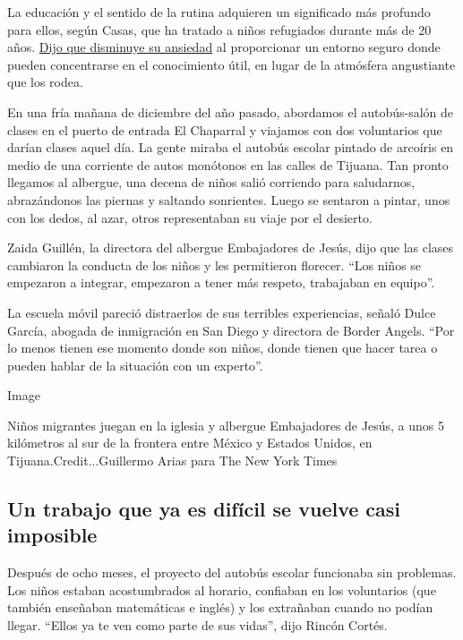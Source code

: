 La educación y el sentido de la rutina adquieren un significado más
profundo para ellos, según Casas, que ha tratado a niños refugiados
durante más de 20 años.
\href{https://onlinelibrary.wiley.com/doi/10.1002/9780470669280.ch12}{Dijo
que disminuye su ansiedad} al proporcionar un entorno seguro donde
pueden concentrarse en el conocimiento útil, en lugar de la atmósfera
angustiante que los rodea.

En una fría mañana de diciembre del año pasado, abordamos el
autobús-salón de clases en el puerto de entrada El Chaparral y viajamos
con dos voluntarios que darían clases aquel día. La gente miraba el
autobús escolar pintado de arcoíris en medio de una corriente de autos
monótonos en las calles de Tijuana. Tan pronto llegamos al albergue, una
decena de niños salió corriendo para saludarnos, abrazándonos las
piernas y saltando sonrientes. Luego se sentaron a pintar, unos con los
dedos, al azar, otros representaban su viaje por el desierto.

Zaida Guillén, la directora del albergue Embajadores de Jesús, dijo que
las clases cambiaron la conducta de los niños y les permitieron
florecer. ``Los niños se empezaron a integrar, empezaron a tener más
respeto, trabajaban en equipo''.

La escuela móvil pareció distraerlos de sus terribles experiencias,
señaló Dulce García, abogada de inmigración en San Diego y directora de
Border Angels. ``Por lo menos tienen ese momento donde son niños, donde
tienen que hacer tarea o pueden hablar de la situación con un experto''.

Image

Niños migrantes juegan en la iglesia y albergue Embajadores de Jesús, a
unos 5 kilómetros al sur de la frontera entre México y Estados Unidos,
en Tijuana.Credit...Guillermo Arias para The New York Times

\hypertarget{un-trabajo-que-ya-es-difuxedcil-se-vuelve-casi-imposible}{%
\subsection{Un trabajo que ya es difícil se vuelve casi
imposible}\label{un-trabajo-que-ya-es-difuxedcil-se-vuelve-casi-imposible}}

Después de ocho meses, el proyecto del autobús escolar funcionaba sin
problemas. Los niños estaban acostumbrados al horario, confiaban en los
voluntarios (que también enseñaban matemáticas e inglés) y los
extrañaban cuando no podían llegar. ``Ellos ya te ven como parte de sus
vidas'', dijo Rincón Cortés.

